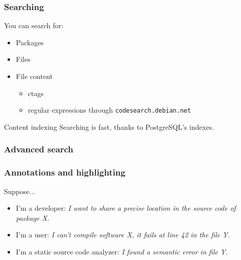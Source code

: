 \documentclass{beamer}
\begin{document}
\begin{frame}
  \frametitle{Searching}
  You can search for:
  \begin{itemize}
  \item Packages
  \item Files
  \item File content
    \begin{itemize}
    \item ctags
    \item regular expressions through \texttt{codesearch.debian.net}
    \end{itemize}
  \end{itemize}
  \pause
  \begin{block}{Content indexing}
    Searching is fast, thanks to PostgreSQL's indexes.
  \end{block}
\end{frame}

\begin{frame}
  \frametitle{Advanced search}
\end{frame}

\begin{frame}
  \frametitle{Annotations and highlighting}
  \begin{block}{Suppose...}
    \begin{itemize}
      \item I'm a \alert{developer}: \textit{I want to share a
        precise location in the source code of package X.}
      \item I'm a \alert{user}: \textit{I can't compile software X,
        it fails at line 42 in the file Y.}
      \item I'm a \alert{static source code analyzer}: \textit{I
        found a semantic error in file Y.}
    \end{itemize}
  \end{block}
\end{frame}
\end{document}
